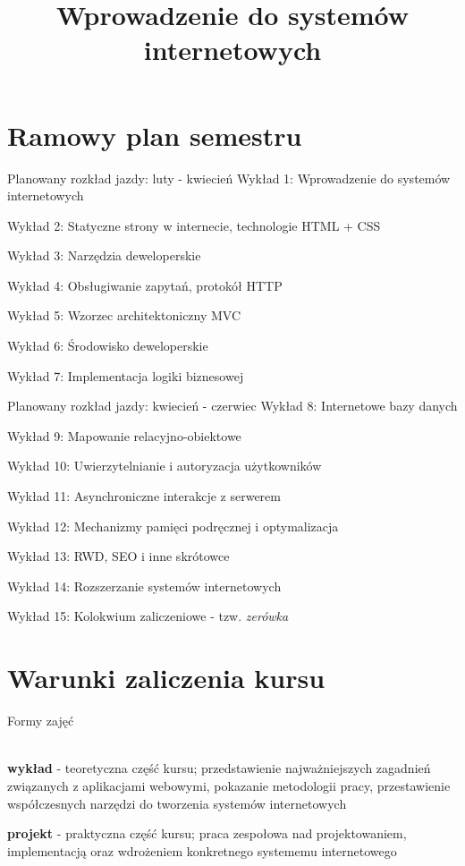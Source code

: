 

\title{Wprowadzenie do systemów internetowych}



\section{Ramowy plan semestru}

\begin{frame}{Planowany rozkład jazdy: luty - kwiecień}
	Wykład 1: Wprowadzenie do systemów internetowych
	
	Wykład 2: Statyczne strony w internecie, technologie HTML + CSS
	
	Wykład 3: Narzędzia deweloperskie
	
	Wykład 4: Obsługiwanie zapytań, protokół HTTP
	
	Wykład 5: Wzorzec architektoniczny MVC
	
	Wykład 6: Środowisko deweloperskie
	
	Wykład 7: Implementacja logiki biznesowej
\end{frame}

\begin{frame}{Planowany rozkład jazdy: kwiecień - czerwiec}
	Wykład 8: Internetowe bazy danych
	
	Wykład 9: Mapowanie relacyjno-obiektowe
	
	Wykład 10: Uwierzytelnianie i autoryzacja użytkowników
	
	Wykład 11: Asynchroniczne interakcje z serwerem
	
	Wykład 12: Mechanizmy pamięci podręcznej i optymalizacja
	
	Wykład 13: RWD, SEO i inne skrótowce
	
	Wykład 14: Rozszerzanie systemów internetowych
	
	Wykład 15: Kolokwium zaliczeniowe - tzw. \emph{zerówka}
\end{frame}

\section{Warunki zaliczenia kursu}

\begin{frame}{Formy zajęć}
	\begin{figure}
	\end{figure}
	
	\ \\
	
	\textbf{wykład} - teoretyczna część kursu; przedstawienie najważniejszych zagadnień związanych z aplikacjami webowymi, pokazanie metodologii pracy, przestawienie współczesnych narzędzi do tworzenia systemów internetowych
	
	\textbf{projekt} - praktyczna część kursu; praca zespołowa nad projektowaniem, implementacją oraz wdrożeniem konkretnego systememu internetowego
\end{frame}


